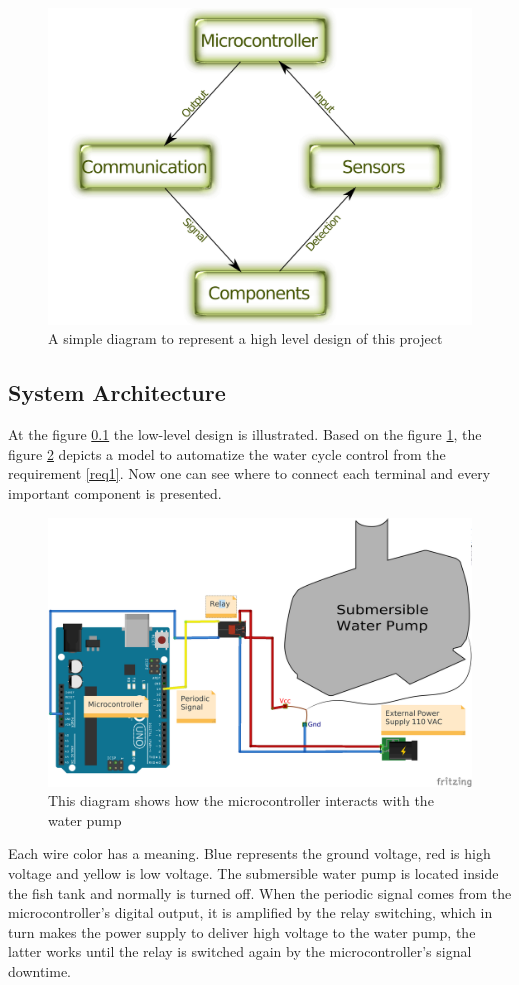 \begin{figure}[h]
    \centering
    \includegraphics[width=.7\linewidth]{diagrams/systemDesign}
    \caption{A simple diagram to represent a high level design of this project}
    \label{fig:highLevelSystemDesign}
\end{figure}

\subsection{System Architecture}
\label{sec:architecture}

At the figure \ref{sec:architecture} the low-level design is illustrated.
Based on the figure \ref{fig:highLevelSystemDesign},
the figure \ref{fig:waterCycleDiagram} depicts a model to automatize the water cycle control from the requirement \ref{req1}.
Now one can see where to connect each terminal and every important component is presented.

\begin{figure}[h]
    \centering
    \includegraphics[width=.6\linewidth]{diagrams/architecture_bb}
    \caption{This diagram shows how the microcontroller interacts with the water pump}
    \label{fig:waterCycleDiagram}
\end{figure}

Each wire color has a meaning.
Blue represents the ground voltage,
red is high voltage
and yellow is low voltage.
The submersible water pump is located inside the fish tank and normally is turned off.
When the periodic signal comes from the microcontroller's digital output,
it is amplified by the relay switching,
which in turn makes the power supply to deliver high voltage to the water pump,
the latter works until the relay is switched again by the microcontroller's signal downtime.

